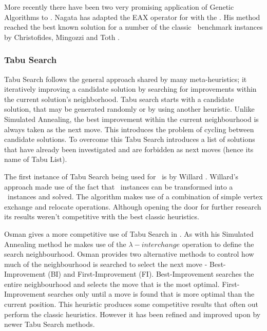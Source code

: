 More recently there have been two very promising application of Genetic Algorithms to \VRP. Nagata \cite{Nagata:2007} has adapted the EAX operator for with the \VRP. His method reached the best known solution for a number of the classic \VRP\ benchmark instances by Christofides, Mingozzi and Toth \cite{CMT:1981}.  



\subsubsection{Tabu Search}
\label{tabusearch}

Tabu Search follows the general approach shared by many meta-heuristics; it iteratively improving a candidate solution by searching for improvements within the current solution's neighborhood. Tabu search starts with a candidate solution, that may be generated randomly or by using another heuristic. Unlike Simulated Annealing, the best improvement within the current neighbourhood is always taken as the next move. This introduces the problem of cycling between candidate solutions. To overcome this Tabu Search introduces a list of solutions that have already been investigated and are forbidden as next moves (hence its name of Tabu List). 

The first instance of Tabu Search being used for \VRP\ is by Willard \cite{Willard:1989}. Willard's approach made use of the fact that \VRP\ instances can be transformed into a \MTSP\ instances and solved. The algorithm makes use of a combination of simple vertex exchange and relocate operations. Although opening the door for further research its results weren't competitive with the best classic heuristics. 

Osman gives a more competitive use of Tabu Search in \cite{Osman:1993}. As with his Simulated Annealing method he makes use of the $\lambda-interchange$ operation to define the search neighbourhood. Osman provides two alternative methods to control how much of the neighbourhood is searched to select the next move - Best-Improvement (BI) and First-Improvement (FI). Best-Improvement searches the entire neighbourhood and selects the move that is the most optimal. First-Improvement searches only until a move is found that is more optimal than the current position. This heuristic produces some competitive results that often out perform the classic heuristics. However it has been refined and improved upon by newer Tabu Search methods.

